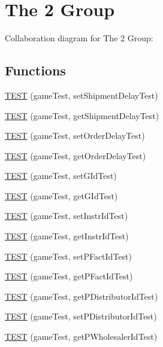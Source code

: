 \hypertarget{group__group2}{}\section{The 2 Group}
\label{group__group2}
Collaboration diagram for The 2 Group\+:
\subsection*{Functions}
\begin{DoxyCompactItemize}
\item 
\hyperlink{group__group2_gaf1d0667641723a1a5714c93a5e3ab030}{T\+E\+ST} (game\+Test, set\+Shipment\+Delay\+Test)
\item 
\hyperlink{group__group2_gaa834d2289bc3bdebf897f2a5edc8a17d}{T\+E\+ST} (game\+Test, get\+Shipment\+Delay\+Test)
\item 
\hyperlink{group__group2_gacba9723d0ad8708e8df11dfcd8018a52}{T\+E\+ST} (game\+Test, set\+Order\+Delay\+Test)
\item 
\hyperlink{group__group2_ga2a35bbb3146e1ab9eedb355942704a56}{T\+E\+ST} (game\+Test, get\+Order\+Delay\+Test)
\item 
\hyperlink{group__group2_ga5b9c78732584c0b347325a95615b6937}{T\+E\+ST} (game\+Test, set\+G\+Id\+Test)
\item 
\hyperlink{group__group2_ga59eeec16be081e481b1407bfeb668cca}{T\+E\+ST} (game\+Test, get\+G\+Id\+Test)
\item 
\hyperlink{group__group2_ga2a20e394bb2b9dd0bc40aacb575cf496}{T\+E\+ST} (game\+Test, set\+Instr\+Id\+Test)
\item 
\hyperlink{group__group2_gaf1f4baf7661402e53fb1f283df721960}{T\+E\+ST} (game\+Test, get\+Instr\+Id\+Test)
\item 
\hyperlink{group__group2_ga0387a0f6fe5a24329ca94f46d1b1c4cd}{T\+E\+ST} (game\+Test, set\+P\+Fact\+Id\+Test)
\item 
\hyperlink{group__group2_ga4bfec1cf153e09237bd237bfc7de2f15}{T\+E\+ST} (game\+Test, get\+P\+Fact\+Id\+Test)
\item 
\hyperlink{group__group2_gaefd1a042142830ac77e7de99e0387890}{T\+E\+ST} (game\+Test, get\+P\+Distributor\+Id\+Test)
\item 
\hyperlink{group__group2_ga21272b3bbdbfe2e069f4251d44c25f70}{T\+E\+ST} (game\+Test, set\+P\+Distributor\+Id\+Test)
\item 
\hyperlink{group__group2_gab476eb42629b88e6becad5a4fc3a35aa}{T\+E\+ST} (game\+Test, get\+P\+Wholesaler\+Id\+Test)
\item 

\end{DoxyCompactItemize}
